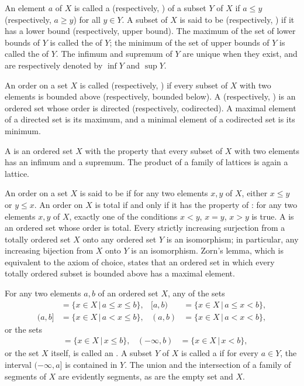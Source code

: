 \documentclass{article}
\begin{document}
An element \(a\) of \(X\) is called a 
(respectively, ) of a subset \(Y\) of \(X\) if
\(a \leq y\) (respectively, \(a \geq y\)) for all \(y \in Y\).  A
subset of \(X\) is said to be  (respectively,
) if it has a lower bound (respectively,
upper bound).  The maximum of the set of lower bounds of \(Y\) is
called the  of \(Y\); the minimum of the set of
upper bounds of \(Y\) is called the  of \(Y\).
The infimum and supremum of \(Y\) are unique when they exist, and are
respectively denoted by \(\inf Y\) and \(\sup Y\).

An order on a set \(X\) is called  (respectively,
) if every subset of \(X\) with two elements is
bounded above (respectively, bounded below).  A  (respectively, ) is an ordered set
whose order is directed (respectively, codirected).  A maximal element
of a directed set is its maximum, and a minimal element of a
codirected set is its minimum.

A  is an ordered set \(X\) with the property that
every subset of \(X\) with two elements has an infimum and a supremum.
The product of a family of lattices is again a lattice.

An order on a set \(X\) is said to be  if for any two
elements \(x, y\) of \(X\), either \(x \leq y\) or \(y \leq x\).  An
order on \(X\) is total if and only if it has the property of
: for any two elements \(x, y\) of \(X\),
exactly one of the conditions \(x < y\), \(x = y\), \(x > y\) is true.
A  is an ordered set whose order is
total.  Every strictly increasing surjection from a totally ordered
set \(X\) onto any ordered set \(Y\) is an isomorphism; in particular,
any increasing bijection from \(X\) onto \(Y\) is an isomorphism.
Zorn's lemma, which is equivalent to the axiom of choice, states that
an ordered set in which every totally ordered subset is bounded above
has a maximal element.

For any two elements \(a, b\) of an ordered set \(X\), any of the sets
\begin{align*}
  [a, b]& = \{ x \in X \,\vert\, a \leq x \leq b \},&
  [a, b)& = \{ x \in X \,\vert\, a \leq x < b \}, \\
  (a, b]& = \{ x \in X \,\vert\, a < x \leq b \},&
  (a, b)& = \{ x \in X \,\vert\, a < x < b \},
\end{align*}
or the sets
\begin{align*}
  [a, \infty)& = \{ x \in X \,\vert\, a \leq x \},&
  (a, \infty)& = \{ x \in X \,\vert\, a < x \}, \\
  (-\infty, b]& = \{ x \in X \,\vert\, x \leq b \},&
  (-\infty, b)& = \{ x \in X \,\vert\, x < b \},
\end{align*}
or the set \(X\) itself, is called an .  A subset
\(Y\) of \(X\) is called a  if for every
\(a \in Y\), the interval \((-\infty, a]\) is contained in \(Y\).  The
union and the intersection of a family of segments of \(X\) are
evidently segments, as are the empty set and \(X\).
\end{document}
